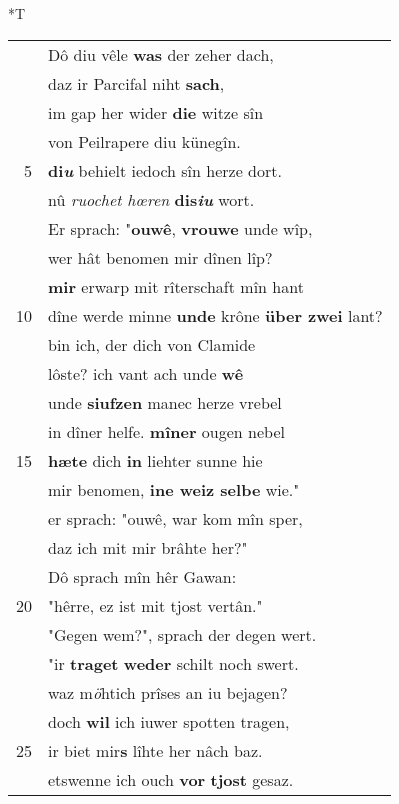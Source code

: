 \documentclass[8pt,a4paper,notitlepage]{article}
\begin{document}
\begin{table}[ht]
\begin{minipage}[t]{0.5\linewidth}
\end{minipage}
\hspace{0.5cm}
\begin{minipage}[t]{0.5\linewidth}
\small
\begin{center}*T
\end{center}
\begin{tabular}{rl}
 & Dô diu vêle \textbf{was} der zeher dach,\\ 
 & daz ir Parcifal niht \textbf{sach},\\ 
 & im gap her wider \textbf{die} witze sîn\\ 
 & von Peilrapere diu künegîn.\\ 
5 & \textbf{di\textit{u}} behielt iedoch sîn herze dort.\\ 
 & nû \textit{ruochet hœren} \textbf{dis\textit{iu}} wort.\\ 
 & Er sprach: "\textbf{ouwê}, \textbf{vrouwe} unde wîp,\\ 
 & wer hât benomen mir dînen lîp?\\ 
 & \textbf{mir} erwarp mit rîterschaft mîn hant\\ 
10 & dîne werde minne \textbf{unde} krône \textbf{über zwei} lant?\\ 
 & bin ich, der dich von Clamide\\ 
 & lôste? ich vant ach unde \textbf{wê}\\ 
 & unde \textbf{siufzen} manec herze vrebel\\ 
 & in dîner helfe. \textbf{mîner} ougen nebel\\ 
15 & \textbf{hæte} dich \textbf{in} liehter sunne hie\\ 
 & mir benomen, \textbf{ine weiz selbe} wie."\\ 
 & er sprach: "ouwê, war kom mîn sper,\\ 
 & daz ich mit mir brâhte her?"\\ 
 & Dô sprach mîn hêr Gawan:\\ 
20 & "hêrre, ez ist mit tjost vertân."\\ 
 & "Gegen wem?", sprach der degen wert.\\ 
 & "ir \textbf{traget} \textbf{weder} schilt noch swert.\\ 
 & waz m\textit{ö}htich prîses an iu bejagen?\\ 
 & doch \textbf{wil} ich iuwer spotten tragen,\\ 
25 & ir biet mir\textbf{s} lîhte her nâch baz.\\ 
 & etswenne ich ouch \textbf{vor} \textbf{tjost} gesaz.\\ 

\end{tabular}
\end{minipage}
\end{table}
\end{document}
